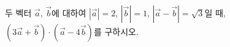 두 벡터 $\vec{a}$, $\vec{b}$에 대하여 $|\vec{a}|=2$, $|\vec{b}|=1$, $|\vec{a}-\vec{b}|=\sqrt{3}$일 때, $(3\vec{a}+\vec{b})\cdot(\vec{a}-4\vec{b})$를 구하시오.
